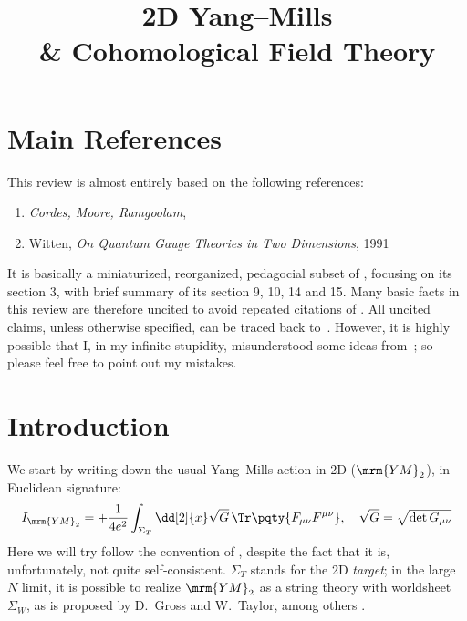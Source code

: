 \documentclass[a4paper
	,10pt
]{article}
\title{2D Yang--Mills \\ \& Cohomological Field Theory}
\newcommand{\YM}{{\ensuremath{\mrm{YM}_2}}\xspace}
\begin{document}
\maketitle
{}
\thispagestyle{empty}


\setlength{\parskip}{.1\baselineskip}
\tableofcontents
\setlength{\parskip}{\parskipnorm}

\section*{Main References}
	This review is almost entirely based on the following references:
	\begin{enumerate}[
		noitemsep
		,labelindent=\parindent
		,align=left
		,leftmargin=*
	]
	\item[\cite{Cordes:1994fc}] \textit{Cordes, Moore, Ramgoolam}, 
	\item[\cite{Witten:1991we}] Witten, \textit{On Quantum Gauge Theories in Two Dimensions}, 1991
	\end{enumerate}
	It is basically a miniaturized, reorganized, pedagocial subset of \cite{Cordes:1994fc}, focusing on its section 3, with brief summary of its section 9, 10, 14 and 15. Many basic facts in this review are therefore uncited to avoid repeated citations of \cite{Cordes:1994fc}. All uncited claims, unless otherwise specified, can be traced back to~\cite{Cordes:1994fc}. However, it is highly possible that I, in my infinite stupidity, misunderstood some ideas from~\cite{Cordes:1994fc}; so please feel free to point out my mistakes.
\section{Introduction}
	We start by writing down the usual Yang--Mills action in 2D (\YM), in Euclidean signature:
	\begin{equation}
		I_{\YM}
		= +\frac{1}{4e^2}
			\int_{\Sigma_T} \dd[2]{x}
			\sqrt{G}
			\,\Tr \pqty{F_{\mu\nu} F^{\mu\nu}},
	\quad
		\sqrt{G} = \sqrt{\det G_{\mu\nu}}
	\end{equation}
	Here we will try follow the convention of \cite{Cordes:1994fc}, despite the fact that it is, unfortunately, not quite self-consistent. $\Sigma_T$ stands for the 2D \textit{target}; in the large $N$ limit, it is possible to realize \YM as a string theory with worldsheet $\Sigma_W$, as is proposed by D.~Gross and W.~Taylor, among others \cite{Gross:1992tu,Gross:1993hu,Gross:1993yt}. 
	
\end{document}
